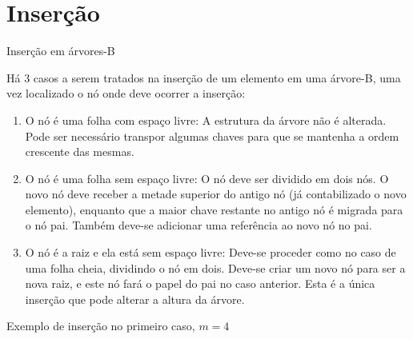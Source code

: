 \section{Inserção}

\begin{frame}[fragile]{Inserção em árvores-B}

	Há 3 casos a serem tratados na {inserção} de um elemento em uma árvore-B, uma vez {localizado} o nó onde deve 
	ocorrer a inserção:

	\begin{enumerate}
		\item {O nó é uma folha com espaço livre}: A estrutura da árvore {não é alterada}. Pode ser necessário 
		{transpor} algumas chaves para que se mantenha a ordem {crescente} das mesmas.

		\item {O nó é uma folha sem espaço livre}: O nó deve ser {dividido} em dois nós. O {novo} 
        nó deve receber a {metade superior} do antigo nó (já contabilizado o novo elemento), 
        enquanto que a {maior chave} restante no antigo nó 
		é migrada para o nó pai. Também deve-se adicionar uma {referência} ao novo nó no pai.

		\item {O nó é a raiz e ela está sem espaço livre}: Deve-se proceder como no caso de uma {folha cheia}, 
		dividindo o nó em dois. Deve-se criar um novo nó para ser a {nova raiz}, e este nó fará o papel do {pai} 
		no caso anterior. Esta é  a única inserção que pode alterar a {altura} da árvore.
	\end{enumerate} 

\end{frame}

\begin{frame}[fragile]{Exemplo de inserção no primeiro caso, $m = 4$}

\end{frame}

